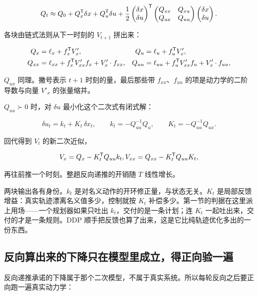 \[
Q_t \approx Q_0 + Q_x^{\mathsf{T}}\delta x + Q_u^{\mathsf{T}}\delta u
+ \frac12
\begin{pmatrix}\delta x\\ \delta u\end{pmatrix}^{\mathsf{T}}
\begin{pmatrix} Q_{xx} & Q_{xu}\\ Q_{ux} & Q_{uu}\end{pmatrix}
\begin{pmatrix}\delta x\\ \delta u\end{pmatrix}.
\]

各块由链式法则从下一时刻的 \(V_{t+1}\) 拼出来：

\[
\begin{aligned}
Q_x &= \ell_x + f_x^{\mathsf{T}} V'_x, &
Q_u &= \ell_u + f_u^{\mathsf{T}} V'_x, \\
Q_{xx} &= \ell_{xx} + f_x^{\mathsf{T}} V'_{xx} f_x + V'_x \cdot f_{xx}, &
Q_{uu} &= \ell_{uu} + f_u^{\mathsf{T}} V'_{xx} f_u + V'_x \cdot f_{uu},
\end{aligned}
\]

\(Q_{ux}\) 同理。撇号表示 \(t+1\) 时刻的量，最后那些带 \(f_{xx}\)、\(f_{uu}\) 的项是动力学的二阶导数与向量 \(V'_x\) 的张量缩并。

\(Q_{uu}\succ 0\) 时，对 \(\delta u\) 最小化这个二次式有闭式解：

\[
\delta u_t = k_t + K_t\,\delta x_t,
\qquad
k_t = -Q_{uu}^{-1}Q_u,
\qquad
K_t = -Q_{uu}^{-1}Q_{ux}.
\]

回代得到 \(V_t\) 的新二次近似，

\[
V_x = Q_x - K_t^{\mathsf{T}}Q_{uu}k_t,
\space
V_{xx} = Q_{xx} - K_t^{\mathsf{T}}Q_{uu}K_t,
\]

再往前推一个时刻。整趟反向递推的开销随 \(T\) 线性增长。

两块输出各有身份。\(k_t\) 是对名义动作的开环修正量，与状态无关。\(K_t\) 是局部反馈增益：真实轨迹漂离名义值多少，控制就按 \(K_t\) 补偿多少。第一节的判据在这里派上用场——一个规划器如果只吐出 \(k_t\)，交付的是一条计划；连 \(K_t\) 一起吐出来，交付的才是一条规则。DDP 顺手把反馈也算了出来，这是它比纯轨迹优化多出的一份东西。

\subsection{反向算出来的下降只在模型里成立，得正向验一遍}

反向递推承诺的下降属于那个二次模型，不属于真实系统。所以每轮反向之后要正向跑一遍真实动力学：

